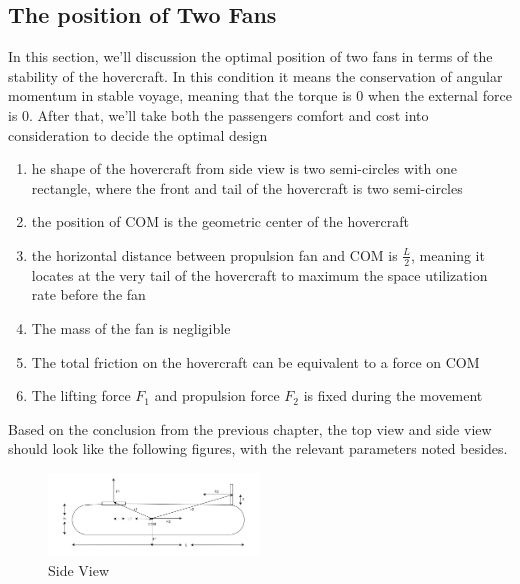 \subsection{The position of Two Fans}
In this section, we'll discussion the optimal position of two fans in terms of the stability of the hovercraft. In this condition it means the conservation of angular momentum in stable voyage, meaning that the torque is 0 when the external force is 0. After that, we'll take both the passengers comfort and cost into consideration to decide the optimal design\\
\begin{enumerate}
    \item he shape of the hovercraft from side view is two semi-circles with one rectangle, where the front and tail of the hovercraft is two semi-circles
    \item the position of COM is the geometric center of the hovercraft
    \item the horizontal distance between propulsion fan and COM is $\frac{L}{2}$, meaning it locates at the very tail of the hovercraft to maximum the space utilization rate before the fan
    \item  The mass of the fan is negligible
    \item The total friction on the hovercraft can be equivalent to a force on COM
    \item The lifting force $F_1$ and propulsion force $F_2$ is fixed during the movement
\end{enumerate}


Based on the conclusion from the previous chapter, the top view and side view should look like the following figures, with the relevant parameters noted besides. 

\begin{figure}[H]
  \centering
  \includegraphics[width=0.5\textwidth,height=0.3\textwidth]{images/TopView.jpg}
  \caption{Side View}
  \label{fig:Side View}
\end{figure}

